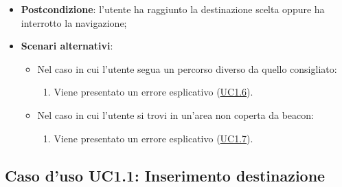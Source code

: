 \documentclass[../AnalisiDeiRequisiti.tex]{subfiles}
\begin{document}
\begin{itemize}
\begin{enumerate}
	\end{enumerate}
	\item \textbf{Postcondizione}: l'utente ha raggiunto la destinazione scelta oppure ha interrotto la navigazione;
	\item \textbf{Scenari alternativi}: 
	\begin{itemize}
		\item Nel caso in cui l'utente segua un percorso diverso da quello consigliato: 
		\begin{enumerate}
			\item Viene presentato un errore esplicativo (\hyperlink{UC1.6}{UC1.6}).
		\end{enumerate}
		\item Nel caso in cui l'utente si trovi in un'area non coperta da beacon: 
		\begin{enumerate}
			\item Viene presentato un errore esplicativo (\hyperlink{UC1.7}{UC1.7}).
		\end{enumerate}
	\end{itemize}
\end{itemize}
\hypertarget{UC1.1}{}
\subsection{Caso d'uso UC1.1: Inserimento destinazione}
\end{document}

